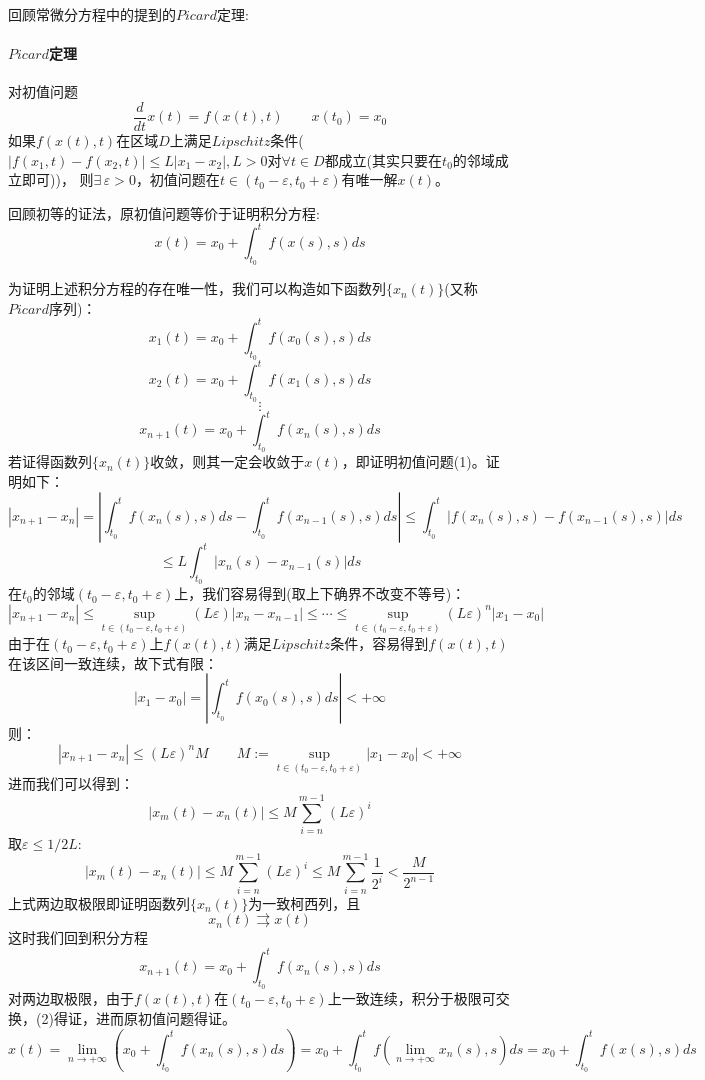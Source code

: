 回顾常微分方程中的提到的$Picard$定理:

\paragraph*{$Picard$定理} \quad 对初值问题
\[\frac{d}{dt}x(t)=f(x(t),t) \qquad x(t_0)=x_0 \tag{1-1}\]
如果$f(x(t),t)$在区域$D$上满足$Lipschitz$条件($|f(x_1,t)-f(x_2,t)| \leq L|x_1-x_2|,L>0$对$\forall t \in D$都成立(其实只要在$t_0$的邻域成立即可))，
则$\exists \, \varepsilon > 0$，初值问题在$t \in (t_0-\varepsilon,t_0+\varepsilon)$有唯一解$x(t)$。

回顾初等的证法，原初值问题等价于证明积分方程:
\[x(t)=x_0+\int_{t_0}^tf(x(s),s)ds \tag{1-2}\]

为证明上述积分方程的存在唯一性，我们可以构造如下函数列$\{x_n(t)\}$(又称$Picard$序列)：
\[x_1(t)=x_0+\int_{t_0}^tf(x_0(s),s)ds\]
\[x_2(t)=x_0+\int_{t_0}^tf(x_1(s),s)ds\]
\[\vdots\]
\[x_{n+1}(t)=x_0+\int_{t_0}^tf(x_n(s),s)ds\]
若证得函数列$\{x_n(t)\}$收敛，则其一定会收敛于$x(t)$，即证明初值问题(1)。证明如下：
\[|x_{n+1}-x_n|=\left|\int_{t_0}^tf(x_n(s),s)ds-\int_{t_0}^tf(x_{n-1}(s),s)ds\right| \leq \int_{t_0}^t \left| f(x_n(s),s)-f(x_{n-1}(s),s) \right| ds\]
\[\leq L\int_{t_0}^t \left| x_n(s)-x_{n-1}(s) \right| ds\]
在$t_0$的邻域$(t_0-\varepsilon,t_0+\varepsilon)$上，我们容易得到(取上下确界不改变不等号)：
\[|x_{n+1}-x_n| \leq {\mathop {\text{sup}}\limits_{t \in (t_0-\varepsilon,t_0+\varepsilon)}} (L\varepsilon)|x_{n}-x_{n-1}| \leq \cdots \leq {\mathop {\text{sup}}\limits_{t \in (t_0-\varepsilon,t_0+\varepsilon)}} (L\varepsilon)^n|x_1-x_0|\]
由于在$(t_0-\varepsilon,t_0+\varepsilon)$上$f(x(t),t)$满足$Lipschitz$条件，容易得到$f(x(t),t)$在该区间一致连续，故下式有限：
\[|x_1-x_0|=|\int_{t_0}^tf(x_0(s),s)ds|<+\infty\]
则：
\[|x_{n+1}-x_n| \leq (L\varepsilon)^nM \qquad M:={\mathop {\text{sup}}\limits_{t \in (t_0-\varepsilon,t_0+\varepsilon)}} |x_1-x_0| <+\infty\]
进而我们可以得到：
\[|x_m(t)-x_n(t)| \leq M\sum_{i=n}^{m-1}(L\varepsilon)^i\]
取$\varepsilon \leq 1/2L$:
\[|x_m(t)-x_n(t)| \leq M\sum_{i=n}^{m-1}(L\varepsilon)^i \leq M\sum_{i=n}^{m-1}\frac{1}{2^i} < \frac{M}{2^{n-1}}\]
上式两边取极限即证明函数列$\{x_n(t)\}$为一致柯西列，且
\[x_n(t) \rightrightarrows x(t)\]
这时我们回到积分方程
\[x_{n+1}(t)=x_0+\int_{t_0}^tf(x_n(s),s)ds\]
对两边取极限，由于$f(x(t),t)$在$(t_0-\varepsilon,t_0+\varepsilon)$上一致连续，积分于极限可交换，(2)得证，进而原初值问题得证。
\[x(t)=\lim_{n \rightarrow +\infty}\left(x_0+\int_{t_0}^tf(x_n(s),s)ds\right)=x_0+\int_{t_0}^tf \left (\lim_{n \rightarrow +\infty}x_n(s),s \right )ds=x_0+\int_{t_0}^tf(x(s),s)ds\]

